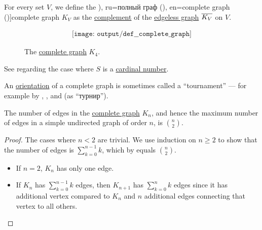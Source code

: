 \begin{definition}\label{def:complete_graph}\mimprovised
  For every set \( V \), we define the \term[bg=пълен граф (\cite[12]{Мирчев2001}), ru=полный граф (\cite[10]{Емеличев1990}), en=complete graph (\cite[def. 1.3.1]{Knauer2011})]{complete graph} \( K_V \) as the \hyperref[def:graph_complement]{complement} of the \hyperref[def:edgeless_graph]{edgeless graph} \( \oline{K_V} \) on \( V \).

  \begin{figure}[!ht]
    \begin{equation}\label{eq:fig:def:complete_graph/k4}
      \begin{aligned}
        \texttt{[image: output/def\_\_complete\_graph]}
      \end{aligned}
    \end{equation}
    \caption{The \hyperref[def:complete_graph]{complete graph} \( K_4 \).}\label{fig:def:complete_graph/k4}
  \end{figure}
\end{definition}
\begin{comments}
  \item See  regarding the case where \( S \) is a \hyperref[def:cardinal]{cardinal number}.

  \item An \hyperref[def:multigraph_orientation]{orientation} of a complete graph is sometimes called a \enquote{tournament} --- for example by , ,  and  (as \enquote{турнир}).
\end{comments}

\begin{proposition}\label{thm:complete_graph_edge_count}
  The number of edges in the \hyperref[def:complete_graph]{complete graph} \( K_n \), and hence the maximum number of edges in a simple undirected graph of order \( n \), is \( \binom n 2 \).
\end{proposition}
\begin{proof}
  The cases where \( n < 2 \) are trivial. We use induction on \( n \geq 2 \) to show that the number of edges is \( \sum_{k=0}^{n-1} k \), which by  equals \( \binom n 2 \).

  \begin{itemize}
    \item If \( n = 2 \), \( K_n \) has only one edge.
    \item If \( K_n \) has \( \sum_{k=0}^{n-1} k \) edges, then \( K_{n+1} \) has \( \sum_{k=0}^n k \) edges since it has additional vertex compared to \( K_n \) and \( n \) additional edges connecting that vertex to all others.
  \end{itemize}
\end{proof}

